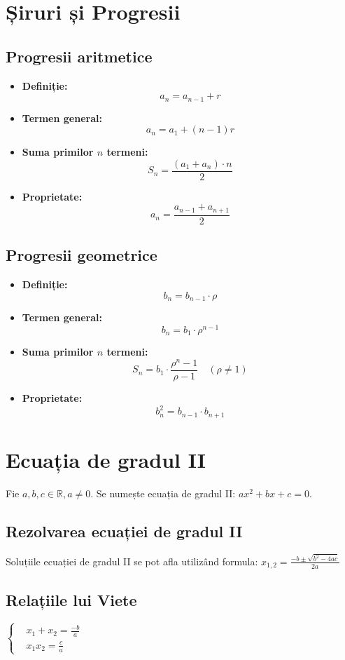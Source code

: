 \documentclass[11pt,a4paper]{article}
\begin{document}
\section{Șiruri și Progresii}

\subsection{Progresii aritmetice}
\begin{itemize}
    \item \textbf{Definiție:} \[ a_n = a_{n-1} + r \]
    \item \textbf{Termen general:} \[ a_n = a_1 + (n-1)r \]
    \item \textbf{Suma primilor $n$ termeni:} \[ S_n = \frac{(a_1 + a_n) \cdot n}{2} \]
    \item \textbf{Proprietate:} \[ a_n = \frac{a_{n-1} + a_{n+1}}{2} \]
\end{itemize}

\subsection{Progresii geometrice}
\begin{itemize}
    \item \textbf{Definiție:} \[ b_n = b_{n-1} \cdot \rho \]
    \item \textbf{Termen general:} \[ b_n = b_1 \cdot \rho^{n-1} \]
    \item \textbf{Suma primilor $n$ termeni:} \[ S_n = b_1 \cdot \frac{\rho^n - 1}{\rho - 1} \quad ( \rho \neq 1) \]
    \item \textbf{Proprietate:} \[ b_n^2 = b_{n-1} \cdot b_{n+1} \]
\end{itemize}

\section{Ecuația de gradul II}
Fie $a, b, c \in \mathbb{R}, a\neq 0$. Se numește ecuația de gradul II: $ax^2 +bx+c=0$.
\subsection{Rezolvarea ecuației de gradul II}
Soluțiile ecuației de gradul II se pot afla utilizând formula: $x_{1,2}= \frac{-b \pm \sqrt{b^2-4ac}}{2a}$
\subsection{Relațiile lui Viete}
$ \left\{
    \begin{aligned}
      & x_1 + x_2 = \frac{-b}{a}\\
      & x_1x_2=\frac{c}{a}
    \end{aligned}
  \right.$
  
\end{document}
